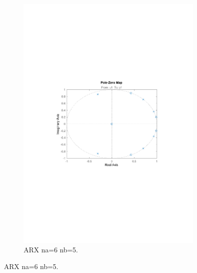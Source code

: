 \documentclass[]{article}
\begin{document}
\begin{figure}[ht]
\begin{subfigure}{.49\textwidth}
	\includegraphics[trim= 10cm 8cm 10cm 8cm, scale=0.4]{figures/pz_arx_65.pdf}
	\caption{ARX na=6 nb=5.}
	\label{fig:pzplot_arx2}
\end{subfigure}
\end{figure}
\end{document}
